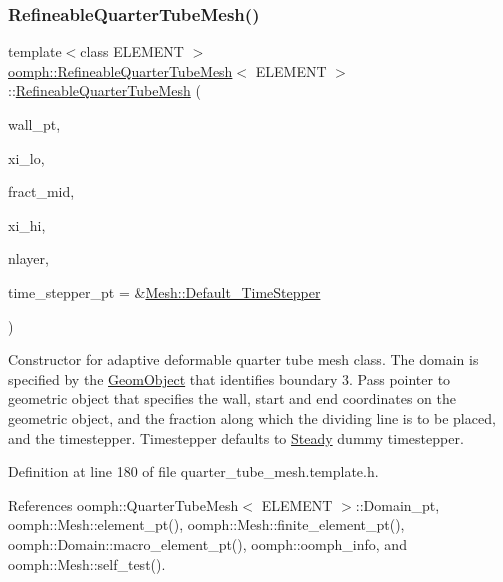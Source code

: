 \subsubsection{\texorpdfstring{Refineable\+Quarter\+Tube\+Mesh()}{RefineableQuarterTubeMesh()}}
{\footnotesize\ttfamily template$<$class E\+L\+E\+M\+E\+NT $>$ \\
\hyperlink{classoomph_1_1RefineableQuarterTubeMesh}{oomph\+::\+Refineable\+Quarter\+Tube\+Mesh}$<$ E\+L\+E\+M\+E\+NT $>$\+::\hyperlink{classoomph_1_1RefineableQuarterTubeMesh}{Refineable\+Quarter\+Tube\+Mesh} (\begin{DoxyParamCaption}\item[{\hyperlink{classoomph_1_1GeomObject}{Geom\+Object} $\ast$}]{wall\+\_\+pt,  }\item[{const \hyperlink{classoomph_1_1Vector}{Vector}$<$ double $>$ \&}]{xi\+\_\+lo,  }\item[{const double \&}]{fract\+\_\+mid,  }\item[{const \hyperlink{classoomph_1_1Vector}{Vector}$<$ double $>$ \&}]{xi\+\_\+hi,  }\item[{const unsigned \&}]{nlayer,  }\item[{\hyperlink{classoomph_1_1TimeStepper}{Time\+Stepper} $\ast$}]{time\+\_\+stepper\+\_\+pt = {\ttfamily \&\hyperlink{classoomph_1_1Mesh_a12243d0fee2b1fcee729ee5a4777ea10}{Mesh\+::\+Default\+\_\+\+Time\+Stepper}} }\end{DoxyParamCaption})\hspace{0.3cm}{\ttfamily [inline]}}



Constructor for adaptive deformable quarter tube mesh class. The domain is specified by the \hyperlink{classoomph_1_1GeomObject}{Geom\+Object} that identifies boundary 3. Pass pointer to geometric object that specifies the wall, start and end coordinates on the geometric object, and the fraction along which the dividing line is to be placed, and the timestepper. Timestepper defaults to \hyperlink{classoomph_1_1Steady}{Steady} dummy timestepper. 



Definition at line 180 of file quarter\+\_\+tube\+\_\+mesh.\+template.\+h.



References oomph\+::\+Quarter\+Tube\+Mesh$<$ E\+L\+E\+M\+E\+N\+T $>$\+::\+Domain\+\_\+pt, oomph\+::\+Mesh\+::element\+\_\+pt(), oomph\+::\+Mesh\+::finite\+\_\+element\+\_\+pt(), oomph\+::\+Domain\+::macro\+\_\+element\+\_\+pt(), oomph\+::oomph\+\_\+info, and oomph\+::\+Mesh\+::self\+\_\+test().

